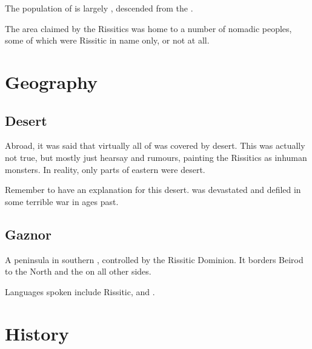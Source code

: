 The \scathaese{} population of \Durcac is largely , descended from the . 

The area claimed by the Rissitics was home to a number of nomadic peoples, some of which were Rissitic in name only, or not at all. 















\section{Geography}





\subsection{Desert}
Abroad, it was said that virtually all of \Durcac was covered by desert. 
This was actually not true, but mostly just hearsay and rumours, painting the Rissitics as inhuman monsters. 
In reality, only parts of eastern \Durcac were desert. 

Remember to have an explanation for this desert. 
\Durcac was devastated and defiled in some terrible war in ages past. 





\subsection{Gaznor}
A peninsula in southern \Velcad{}, controlled by the Rissitic Dominion. It borders Beirod to the North and the \Risvaelsea{} on all other sides. 

Languages spoken include Rissitic, \Velcadian{} and \Ortic. 















\section{History}





